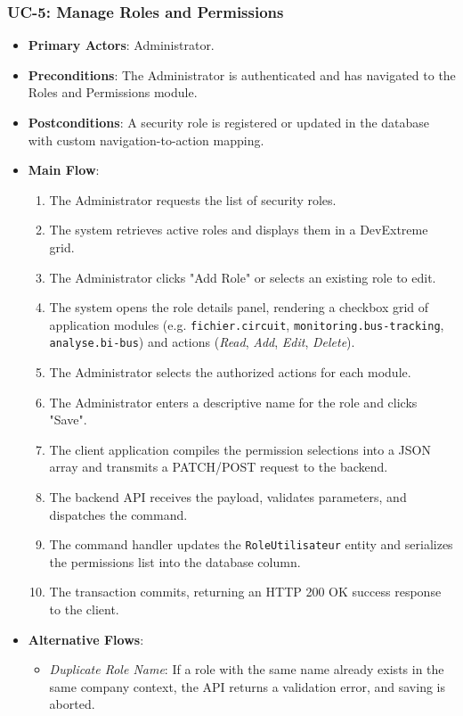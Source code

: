 \subsubsection{UC-5: Manage Roles and Permissions}
\begin{itemize}
  \item \textbf{Primary Actors}: Administrator.
  \item \textbf{Preconditions}: The Administrator is authenticated and has navigated to the Roles and Permissions module.
  \item \textbf{Postconditions}: A security role is registered or updated in the database with custom navigation-to-action mapping.
  \item \textbf{Main Flow}:
  \begin{enumerate}
    \item The Administrator requests the list of security roles.
    \item The system retrieves active roles and displays them in a DevExtreme grid.
    \item The Administrator clicks "Add Role" or selects an existing role to edit.
    \item The system opens the role details panel, rendering a checkbox grid of application modules (e.g. \texttt{fichier.circuit}, \texttt{monitoring.bus-tracking}, \texttt{analyse.bi-bus}) and actions (\emph{Read}, \emph{Add}, \emph{Edit}, \emph{Delete}).
    \item The Administrator selects the authorized actions for each module.
    \item The Administrator enters a descriptive name for the role and clicks "Save".
    \item The client application compiles the permission selections into a JSON array and transmits a PATCH/POST request to the backend.
    \item The backend API receives the payload, validates parameters, and dispatches the command.
    \item The command handler updates the \texttt{RoleUtilisateur} entity and serializes the permissions list into the database column.
    \item The transaction commits, returning an HTTP 200 OK success response to the client.
  \end{enumerate}
  \item \textbf{Alternative Flows}:
  \begin{itemize}
    \item \emph{Duplicate Role Name}: If a role with the same name already exists in the same company context, the API returns a validation error, and saving is aborted.
  \end{itemize}
\end{itemize}

